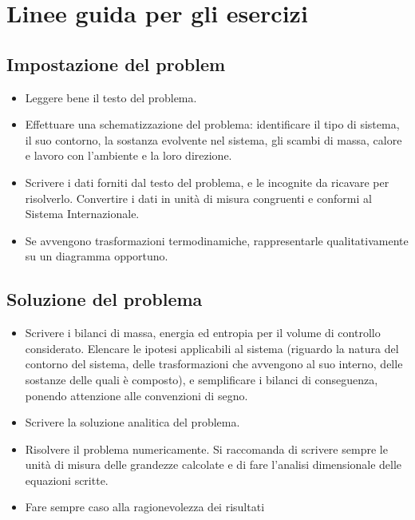 \section{Linee guida per gli esercizi}
\subsection{Impostazione del problem}
\begin{itemize}
    \item Leggere bene il testo del problema.
    \item Effettuare una schematizzazione del problema: identificare il tipo di sistema, il suo
    contorno, la sostanza evolvente nel sistema, gli scambi di massa, calore e lavoro con
    l’ambiente e la loro direzione.
    \item Scrivere i dati forniti dal testo del problema, e le incognite da ricavare per risolverlo.
    Convertire i dati in unità di misura congruenti e conformi al Sistema Internazionale.
    \item Se avvengono trasformazioni termodinamiche, rappresentarle qualitativamente su un
    diagramma opportuno.    
\end{itemize}
\subsection{Soluzione del problema}
\begin{itemize}
    \item Scrivere i bilanci di massa, energia ed entropia per il volume di controllo considerato.
    Elencare le ipotesi applicabili al sistema (riguardo la natura del contorno del sistema, delle
    trasformazioni che avvengono al suo interno, delle sostanze delle quali è composto), e
    semplificare i bilanci di conseguenza, ponendo attenzione alle convenzioni di segno.
    \item Scrivere la soluzione analitica del problema.
    \item Risolvere il problema numericamente. Si raccomanda di scrivere sempre le unità di misura
    delle grandezze calcolate e di fare l’analisi dimensionale delle equazioni scritte.
    \item Fare sempre caso alla ragionevolezza dei risultati  
\end{itemize}
